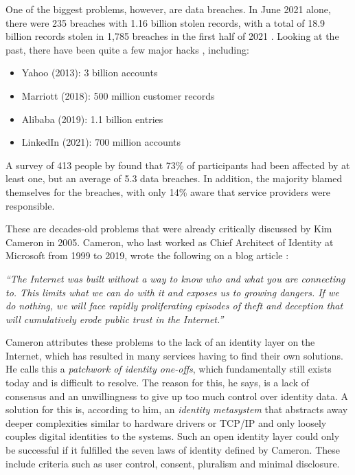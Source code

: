 One of the biggest problems, however, are data breaches. In June 2021 alone, there were 235 breaches with 1.16 billion stolen records, with a total of 18.9 billion records stolen in 1,785 breaches in the first half of 2021 \cite{risk_based_security_data_2021}. Looking at the past, there have been quite a few major hacks \cite{swinhoe_15_2021}, including: 

\begin{itemize}
    \item Yahoo (2013): 3 billion accounts
    \item Marriott (2018): 500 million customer records
    \item Alibaba (2019): 1.1 billion entries
    \item LinkedIn (2021): 700 million accounts
\end{itemize}

A survey of 413 people by \cite{mayer_now_2021} found that 73\% of participants had been affected by at least one, but an average of 5.3 data breaches. In addition, the majority blamed themselves for the breaches, with only 14\% aware that service providers were responsible.

These are decades-old problems that were already critically discussed by Kim Cameron in 2005. Cameron, who last worked as Chief Architect of Identity at Microsoft from 1999 to 2019, wrote the following on a blog article \cite{cameron_laws_2005}:

\begin{displayquote}
    \textit{“The Internet was built without a way to know who and what you are connecting to. This limits what we can do with it and exposes us to growing dangers. If we do nothing, we will face rapidly proliferating episodes of theft and deception that will cumulatively erode public trust in the Internet.”}
\end{displayquote}

Cameron attributes these problems to the lack of an identity layer on the Internet, which has resulted in many services having to find their own solutions. He calls this a \textit{patchwork of identity one-offs}, which fundamentally still exists today and is difficult to resolve. The reason for this, he says, is a lack of consensus and an unwillingness to give up too much control over identity data. A solution for this is, according to him, an \textit{identity metasystem} that abstracts away deeper complexities similar to hardware drivers or TCP/IP and only loosely couples digital identities to the systems.  Such an open identity layer could only be successful if it fulfilled the seven laws of identity defined by Cameron. These include criteria such as user control, consent, pluralism and minimal disclosure. \cite{cameron_laws_2005}

